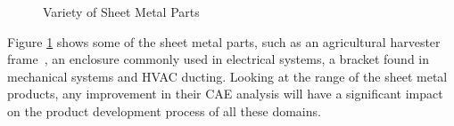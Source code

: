 \begin{figure}[h!]
   \quad
{}
\caption{Variety of Sheet Metal Parts}
\label{fig:introduction:sheetmetalsamples}
\end{figure}


\bigskip


Figure \ref{fig:introduction:sheetmetalsamples} shows some of the sheet metal parts, such as an agricultural harvester frame~\cite{harvester}, an enclosure commonly used in electrical systems, a bracket found in mechanical systems and HVAC ducting. Looking at the range of the sheet metal products, any improvement in their CAE analysis will have a significant impact on the product development process of all these domains. 

